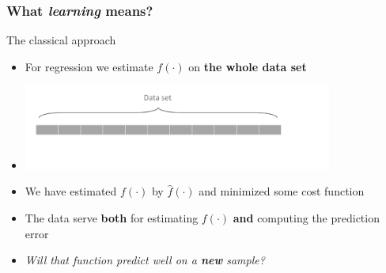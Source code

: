 \documentclass[xcolor=x11names,compress, aspectratio=169]{beamer}
\renewcommand{\(}{\begin{columns}}
\renewcommand{\)}{\end{columns}}
\newcommand{\<}[1]{\begin{column}{#1}}
\renewcommand{\>}{\end{column}}
\begin{document}
%
%


\begin{frame}
\frametitle{\textcolor{brique}{ What \emph{learning} means?}}
The classical approach
\begin{itemize}[<+->]
\item For regression we estimate $f(\cdot)$ on \textbf{the whole data set}
\item[] \includegraphics[width = 0.8\textwidth]{ML-Sets1.png}
\item We have estimated $f(\cdot)$ by $\widehat f(\cdot)$  and minimized some cost function
\item The data serve \textbf{both} for estimating $f(\cdot)$ \textbf{and} computing the prediction error
\item \emph{Will that function predict well on a \textcolor[rgb]{1.00,0.00,0.00}{\textbf{new }}sample?}
\end{itemize}
\end{frame}
\end{document}
